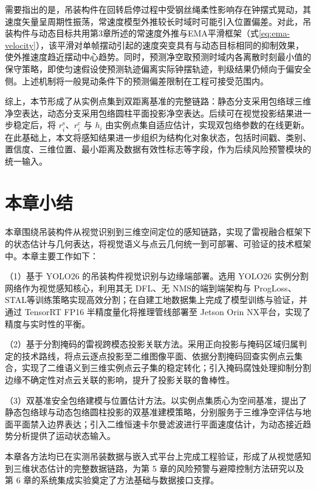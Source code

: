 需要指出的是，吊装构件在回转启停过程中受钢丝绳柔性影响存在钟摆式晃动，其速度矢量呈周期性振荡，常速度模型外推较长时域时可能引入位置偏差。对此，吊装构件与动态目标共用第3章所述的常速度外推与EMA平滑框架（式\ref{eq:ema-velocity}），该平滑对单帧摆动引起的速度突变具有与动态目标相同的抑制效果，使外推速度趋近摆动中心趋势。同时，预测净空取预测时域内各离散时刻最小值的保守策略，即使匀速假设使预测轨迹偏离实际钟摆轨迹，判级结果仍倾向于偏安全侧。上述机制将一般晃动条件下的预测偏差限制在工程可接受范围内。

综上，本节形成了从实例点集到双距离基准的完整链路：静态分支采用包络球三维净空表达，动态分支采用包络圆柱平面投影净空表达。后续可在视觉投影结果进一步稳定后，将 $r_i^{\mathrm{s}}$、$r_i^{\mathrm{c}}$ 与 $h_i$ 由实例点集自适应估计，实现双包络参数的在线更新。在此基础上，本文将感知结果进一步组织为结构化对象状态，包括时间戳、类别、置信度、三维位置、最小距离及数据有效性标志等字段，作为后续风险预警模块的统一输入。


\section{本章小结}\label{sec:ch4_summary}

本章围绕吊装构件从视觉识别到三维空间定位的感知链路，实现了雷视融合框架下的状态估计与几何表达，将视觉语义与点云几何统一到可部署、可验证的技术框架中。本章主要工作如下：

（1）基于 YOLO26 的吊装构件视觉识别与边缘端部署。选用 YOLO26 实例分割网络作为视觉感知核心，利用其无 DFL、无 NMS的端到端架构与 ProgLoss、STAL等训练策略实现高效分割；在自建工地数据集上完成了模型训练与验证，并通过 TensorRT FP16 半精度量化将推理管线部署至 Jetson Orin NX平台，实现了精度与实时性的平衡。

（2）基于分割掩码的雷视跨模态投影关联方法。采用正向投影与掩码区域归属判定的技术路线，将点云逐点投影至二维图像平面、依据分割掩码回查实例点云集合，实现了二维语义到三维实例点云子集的稳定转化；引入掩码腐蚀处理抑制分割边缘不确定性对点云关联的影响，提升了投影关联的鲁棒性。

（3）双基准安全包络建模与位置估计方法。以实例点集质心为空间基准，提出了静态包络球与动态包络圆柱投影的双基准建模策略，分别服务于三维净空评估与地面平面禁入边界表达；引入二维恒速卡尔曼滤波进行平面速度估计，为动态接近趋势分析提供了运动状态输入。

本章各方法均已在实测吊装数据与嵌入式平台上完成工程验证，形成了从视觉感知到三维状态估计的完整数据链路，为第 5 章的风险预警与避障控制方法研究以及第 6 章的系统集成实验奠定了方法基础与数据接口支撑。